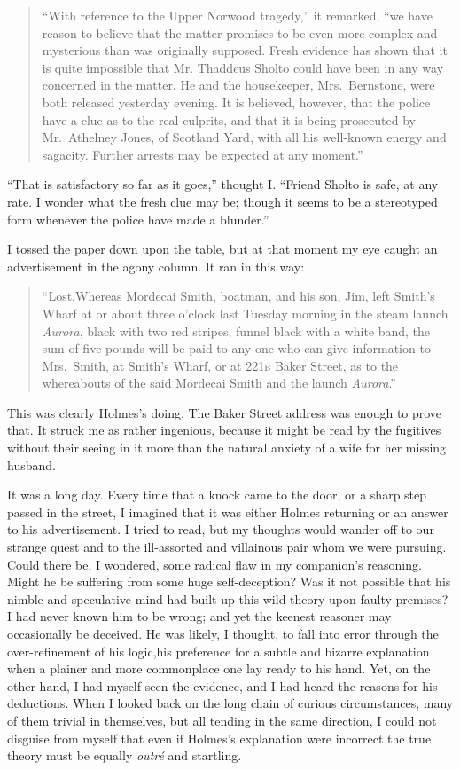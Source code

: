 \documentclass[12pt,english,oneside]{book}
\newcommand{\noun}[1]{\textsc{#1}}
\begin{document}
\begin{quote} {}``With reference to the Upper Norwood tragedy,''
it remarked, {}``we have reason to believe that the matter promises
to be even more complex and mysterious than was originally supposed.
Fresh evidence has shown that it is quite impossible that Mr. Thaddeus
Sholto could have been in any way concerned in the matter. He and
the housekeeper, Mrs.\ Bernstone, were both released yesterday evening.
It is believed, however, that the police have a clue as to the real
culprits, and that it is being prosecuted by Mr.\ Athelney Jones,
of Scotland Yard, with all his well-known energy and sagacity. Further
arrests may be expected at any moment.''\end{quote}

{}``That is satisfactory so far as it goes,'' thought I. {}``Friend
Sholto is safe, at any rate. I wonder what the fresh clue may be;
though it seems to be a stereotyped form whenever the police have
made a blunder.''

I tossed the paper down upon the table, but at that moment my eye
caught an advertisement in the agony column. It ran in this way:

\begin{quote} {}``Lost.\mdsh{---}Whereas Mordecai Smith, boatman,
and his son, Jim, left Smith's Wharf at or about three o'clock last
Tuesday morning in the steam launch \emph{Aurora}, black with two
red stripes, funnel black with a white band, the sum of five pounds
will be paid to any one who can give information to Mrs.\ Smith,
at Smith's Wharf, or at \noun{221b} Baker Street, as to the whereabouts
of the said Mordecai Smith and the launch \emph{Aurora}.''\end{quote}

This was clearly Holmes's doing. The Baker Street address was enough
to prove that. It struck me as rather ingenious, because it might
be read by the fugitives without their seeing in it more than the
natural anxiety of a wife for her missing husband.

It was a long day. Every time that a knock came to the door, or a
sharp step passed in the street, I imagined that it was either Holmes
returning or an answer to his advertisement. I tried to read, but
my thoughts would wander off to our strange quest and to the ill-assorted
and villainous pair whom we were pursuing. Could there be, I wondered,
some radical flaw in my companion's reasoning. Might he be suffering
from some huge self-deception? Was it not possible that his nimble
and speculative mind had built up this wild theory upon faulty premises?
I had never known him to be wrong; and yet the keenest reasoner may
occasionally be deceived. He was likely, I thought, to fall into error
through the over-refinement of his logic,\mdsh{---}his preference
for a subtle and bizarre explanation when a plainer and more commonplace
one lay ready to his hand. Yet, on the other hand, I had myself seen
the evidence, and I had heard the reasons for his deductions. When
I looked back on the long chain of curious circumstances, many of
them trivial in themselves, but all tending in the same direction,
I could not disguise from myself that even if Holmes's explanation
were incorrect the true theory must be equally \emph{outr\'{e}} and startling.
\end{document}
